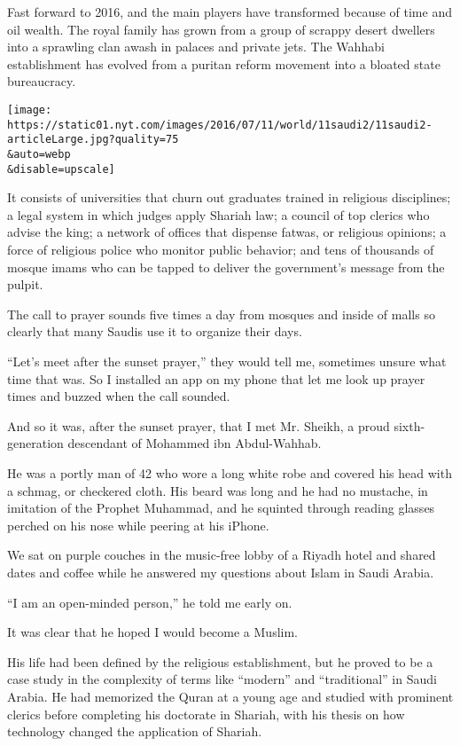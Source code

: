 Fast forward to 2016, and the main players have transformed because of
time and oil wealth. The royal family has grown from a group of scrappy
desert dwellers into a sprawling clan awash in palaces and private jets.
The Wahhabi establishment has evolved from a puritan reform movement
into a bloated state bureaucracy.

\texttt{[image: https://static01.nyt.com/images/2016/07/11/world/11saudi2/11saudi2-articleLarge.jpg?quality=75\\\&auto=webp\\\&disable=upscale]}

It consists of universities that churn out graduates trained in
religious disciplines; a legal system in which judges apply Shariah law;
a council of top clerics who advise the king; a network of offices that
dispense fatwas, or religious opinions; a force of religious police who
monitor public behavior; and tens of thousands of mosque imams who can
be tapped to deliver the government's message from the pulpit.

The call to prayer sounds five times a day from mosques and inside of
malls so clearly that many Saudis use it to organize their days.

``Let's meet after the sunset prayer,'' they would tell me, sometimes
unsure what time that was. So I installed an app on my phone that let me
look up prayer times and buzzed when the call sounded.

And so it was, after the sunset prayer, that I met Mr. Sheikh, a proud
sixth-generation descendant of Mohammed ibn Abdul-Wahhab.

He was a portly man of 42 who wore a long white robe and covered his
head with a schmag, or checkered cloth. His beard was long and he had no
mustache, in imitation of the Prophet Muhammad, and he squinted through
reading glasses perched on his nose while peering at his iPhone.

We sat on purple couches in the music-free lobby of a Riyadh hotel and
shared dates and coffee while he answered my questions about Islam in
Saudi Arabia.

``I am an open-minded person,'' he told me early on.

It was clear that he hoped I would become a Muslim.

His life had been defined by the religious establishment, but he proved
to be a case study in the complexity of terms like ``modern'' and
``traditional'' in Saudi Arabia. He had memorized the Quran at a young
age and studied with prominent clerics before completing his doctorate
in Shariah, with his thesis on how technology changed the application of
Shariah.

